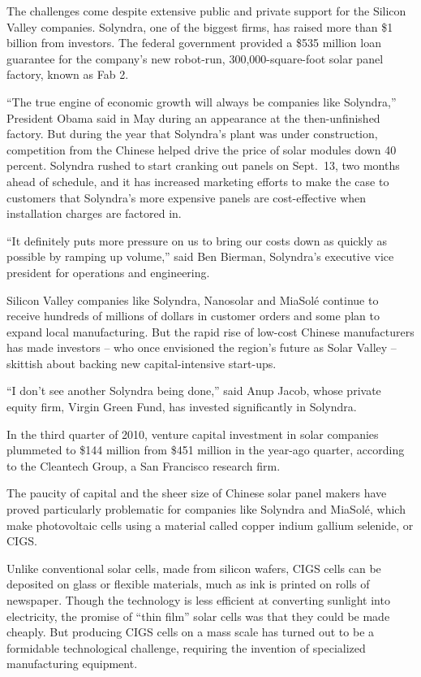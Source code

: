 ﻿\documentclass[12pt]{article}
\begin{document}
The challenges come despite extensive public and private support for the Silicon Valley companies.
Solyndra, one of the biggest firms, has raised more than \$1 billion from investors. The federal
government provided a \$535 million loan guarantee for the company's new robot-run,
300,000-square-foot solar panel factory, known as Fab 2.

``The true engine of economic growth will always be companies like Solyndra,'' President Obama said
in May during an appearance at the then-unfinished factory. But during the year that Solyndra's
plant was under construction, competition from the Chinese helped drive the price of solar modules
down 40 percent. Solyndra rushed to start cranking out panels on Sept.~13, two months ahead of
schedule, and it has increased marketing efforts to make the case to customers that Solyndra's more
expensive panels are cost-effective when installation charges are factored in.

``It definitely puts more pressure on us to bring our costs down as quickly as possible by ramping
up volume,'' said Ben Bierman, Solyndra's executive vice president for operations and engineering.

Silicon Valley companies like Solyndra, Nanosolar and MiaSol\'e continue to receive hundreds of
millions of dollars in customer orders and some plan to expand local manufacturing. But the rapid
rise of low-cost Chinese manufacturers has made investors -- who once envisioned the region's future
as Solar Valley -- skittish about backing new capital-intensive start-ups.

``I don't see another Solyndra being done,'' said Anup Jacob, whose private equity firm, Virgin
Green Fund, has invested significantly in Solyndra.

In the third quarter of 2010, venture capital investment in solar companies plummeted to \$144
million from \$451 million in the year-ago quarter, according to the Cleantech Group, a San
Francisco research firm.

The paucity of capital and the sheer size of Chinese solar panel makers have proved particularly
problematic for companies like Solyndra and MiaSol\'e, which make photovoltaic cells using a
material called copper indium gallium selenide, or CIGS.

Unlike conventional solar cells, made from silicon wafers, CIGS cells can be deposited on glass or
flexible materials, much as ink is printed on rolls of newspaper. Though the technology is less
efficient at converting sunlight into electricity, the promise of ``thin film'' solar cells was that
they could be made cheaply. But producing CIGS cells on a mass scale has turned out to be a
formidable technological challenge, requiring the invention of specialized manufacturing equipment.
\end{document}
